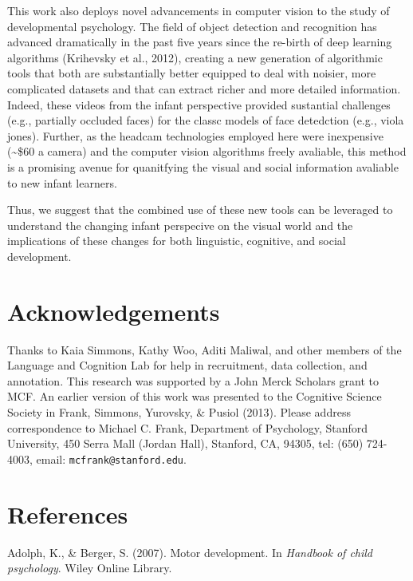 \documentclass[10pt, letterpaper]{article}
\begin{document}
This work also deploys novel advancements in computer vision to the
study of developmental psychology. The field of object detection and
recognition has advanced dramatically in the past five years since the
re-birth of deep learning algorithms (Krihevsky et al., 2012), creating
a new generation of algorithmic tools that both are substantially better
equipped to deal with noisier, more complicated datasets and that can
extract richer and more detailed information. Indeed, these videos from
the infant perspective provided sustantial challenges (e.g., partially
occluded faces) for the classc models of face detedction (e.g., viola
jones). Further, as the headcam technologies employed here were
inexpensive (\textasciitilde{}\$60 a camera) and the computer vision
algorithms freely avaliable, this method is a promising avenue for
quanitfying the visual and social information avaliable to new infant
learners.

Thus, we suggest that the combined use of these new tools can be
leveraged to understand the changing infant perspecive on the visual
world and the implications of these changes for both linguistic,
cognitive, and social development.

\section{Acknowledgements}\label{acknowledgements}

Thanks to Kaia Simmons, Kathy Woo, Aditi Maliwal, and other members of
the Language and Cognition Lab for help in recruitment, data collection,
and annotation. This research was supported by a John Merck Scholars
grant to MCF. An earlier version of this work was presented to the
Cognitive Science Society in Frank, Simmons, Yurovsky, \& Pusiol (2013).
Please address correspondence to Michael C. Frank, Department of
Psychology, Stanford University, 450 Serra Mall (Jordan Hall), Stanford,
CA, 94305, tel: (650) 724-4003, email: \texttt{mcfrank@stanford.edu}.

\section{References}\label{references}

\setlength{\parindent}{-0.1in} \setlength{\leftskip}{0.125in} \noindent

\hypertarget{refs}{}
\hypertarget{ref-adolph2007}{}
Adolph, K., \& Berger, S. (2007). Motor development. In \emph{Handbook
of child psychology}. Wiley Online Library.
\end{document}
